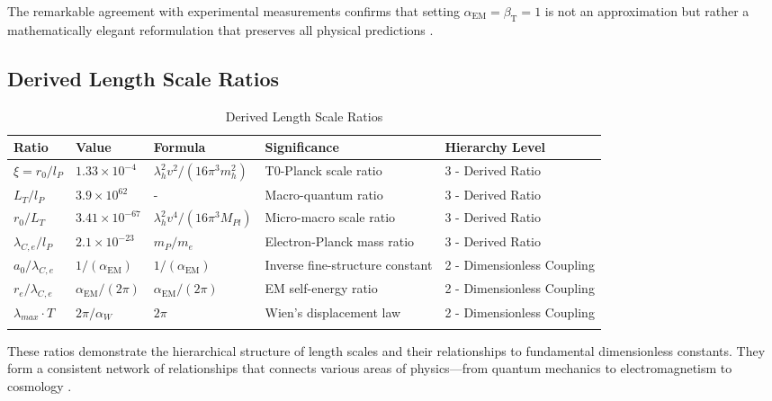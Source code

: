 \documentclass[12pt,a4paper]{article}
\newcommand{\alphaEM}{\alpha_{\text{EM}}}
\newcommand{\betaT}{\beta_{\text{T}}}
\begin{document}
The remarkable agreement with experimental measurements confirms that setting $\alphaEM = \betaT = 1$ is not an approximation but rather a mathematically elegant reformulation that preserves all physical predictions \cite{pascher_emergente_2025, pascher_alphabeta_2025}.

	
	\subsection{Derived Length Scale Ratios}
	
	\begin{table}[ht]
		\centering
		\begin{adjustbox}{scale=0.75}
			\begin{tabular}{lllll}
				\hline
				\textbf{Ratio} & \textbf{Value} & \textbf{Formula} & \textbf{Significance} & \textbf{Hierarchy Level} \\
				\hline
				$\xi = r_0/l_P$ & $1.33 \times 10^{-4}$ & $\lambda_h^2v^2/(16\pi^3m_h^2)$ & T0-Planck scale ratio & 3 - Derived Ratio \\
				$L_T/l_P$ & $3.9 \times 10^{62}$ & - & Macro-quantum ratio & 3 - Derived Ratio \\
				$r_0/L_T$ & $3.41 \times 10^{-67}$ & $\lambda_h^2v^4/(16\pi^3M_{Pl})$ & Micro-macro scale ratio & 3 - Derived Ratio \\
				$\lambda_{C,e}/l_P$ & $2.1 \times 10^{-23}$ & $m_P/m_e$ & Electron-Planck mass ratio & 3 - Derived Ratio \\
				$a_0/\lambda_{C,e}$ & $1/(\alphaEM)$ & $1/(\alphaEM)$ & Inverse fine-structure constant & 2 - Dimensionless Coupling \\
				$r_e/\lambda_{C,e}$ & $\alphaEM/(2\pi)$ & $\alphaEM/(2\pi)$ & EM self-energy ratio & 2 - Dimensionless Coupling \\
				$\lambda_{max} \cdot T$ & $2\pi/\alpha_W$ & $2\pi$ & Wien’s displacement law & 2 - Dimensionless Coupling \\
				\hline
				\multicolumn{4}{c}{} \\
				\hline
			\end{tabular}
		\end{adjustbox}
		\caption{Derived Length Scale Ratios}
		\label{tab:length_ratios}
	\end{table}
	
	These ratios demonstrate the hierarchical structure of length scales and their relationships to fundamental dimensionless constants. They form a consistent network of relationships that connects various areas of physics—from quantum mechanics to electromagnetism to cosmology \cite{pascher_planck_2025}.
	
\end{document}
